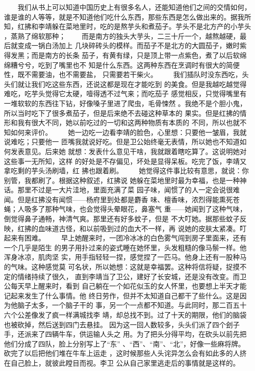  　　我们从书上可以知道中国历史上有很多名人，还能知道他们之间的交情如何， 谁是谁的人等等，就是不知道他们吃什么东西，那些东西是怎么做出来的。据我所 知，红拂和李靖躲在菜地里时，吃的是熬芋头和煮茄子。芋头不是北方产的小芋头 ，蒸熟了绵软那种； 　　而是南方的独头大芋头，二三十斤一个，越熬越硬，最后就变成一锅白汤加上 几块碎砖头的模样。而茄子不是北方的大圆茄子，嫩时紫得发黑；而是南方的长条 茄子，有黄有绿，只是顶上带一点紫色，煮了以后软绵绵糟兮兮，吃到了嘴里也不 知是什么东西。这两种东西在烹调时有很大的简便性，既不需要油，也不需要盐， 只需要若干柴火。 　　我们插队时没东西吃，头头们就让我们吃这些东西，还说这都是现在才能吃到 的美食。但是我越吃越觉得难吃，吃芋头觉得它太硬，噎得透不过气来；而吃茄子 感觉相反，只觉得嘴里有一堆软软的东西往下钻，好像嗓子里进了爬虫，毛骨悚然 。我绝不是个胆小鬼，所以当时吃下了很多煮茄子，但是后来绝不去碰这种草本的 果实。但是红拂的情形和我有很大不同，她以前吃过的一切和这两种物质有本质的 不同，所以也就不知如何来评价。 　　她一边吃一边看李靖的脸色，心里想：只要他一皱眉，我就说难吃；只要他一 匝嘴我就说好吃。但是卫公始终毫无表情，所以她也不知道如何发表意见。后来她 就想：发表什么意见干啥，我就跟着瞎吃算了。这说明她对这些事一无所知，这样 的好处是不存偏见，坏处是显得呆板。吃完了饭，李靖又拿吃剩的芋头汤刷墙，红 拂也跟着刷。 　　她觉得这件事比较有意思，就说：你别管，我都刷了。根据这种叙述，红拂说 她躲在菜地里时最为幸福，也是一种神话。那里不过是一大片洼地，里面充满了菜 园子味，闻惯了的人一定会说很难闻。但是红拂没有闻惯——杨府里到处都是麝香 味、檀香味，浓烈得能熏死苍蝇；人吸多了那种气味，也会觉得头晕眼花，鼻塞气 重——她闻到了这种气味，倒觉得鼻子通畅，神清气爽。那里还有好多蚊子，但是 不大叮她。据那些蚊子反映，红拂的血味道古怪，和以前吸到过的血大不一样，再 说她的皮肤太紧凑。叮起来有困难。 　　早上她醒来时，一团冷冰冰的白色雾气闯到房子里面来，还有一个几乎是陌生 的男子用扑过来的姿式睡在她怀里，头发粗糙的像马鬃一样。他浑身冰凉，肌肉坚 实，用手指轻轻一捏，感觉捏了一匹马。他身上还有一股种马的气味。这种感觉莫 可名状，所以她想：这就是幸福罢。这种将信将疑，捉摸不定的情绪持续了很久， 直到李靖当了卫公，建好了长安城，还是没有改变。而卫公每天早上醒来时，看到 自己躺在一个如花似玉的女人怀里，也要想上半天才能记起来发生了什么事情。他 终日劳作，但并不太知道自己都干了些什么。这是因为他脑子太多，一个脑子干的 事，另一个一点都不知道。与此同时，那二百五十六个公差像发了疯一样满城找李 靖，却总找不到。过了十天的期限，他们的脑袋也被砍掉，然后送到四门去悬挂。 因为这一回人数较多，头头们派了四个刽子手，还派来了四辆牛车，供运输人头之 用。为了把头分得平均，在砍头以前先把他们分成了四队，脸上分别写上了“东” 、“西”、“南”、“北”，好像一些麻将牌。砍完了以后把他们堆在牛车上运走 ，这时候那些人头诧异怎么会有如此多的人挤在自己脸上，就彼此瞠目而视。李卫 公从自己家里逃走后的事情就是这样的。 
 
